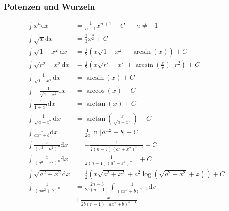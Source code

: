 \documentclass[8pt, a4paper, landscape, fleqn]{scrartcl}
\def\d{\text{d}}
\begin{document}
\begin{multicols*}{3}
				\subsubsection{Potenzen und Wurzeln}
					\vspace{-7pt}
					\begin{align*}
					    \int x^n\text{d}x&= \frac{1}{n+1}x^{n+1}+C \hspace{20pt}n\neq-1\\
					    \int \sqrt{x}\text{d}x&= \frac{2}{3}x^{\frac{3}{2}}+C\\
						\int \sqrt{1-x^2}\text{d}x&= \frac{1}{2} \left(x\sqrt{1-x^2}+\arcsin(x)\right)+C\\
						\int \sqrt{r^2-x^2}\text{d}x&= \frac{1}{2} \left(x\sqrt{r^2-x^2}+\arcsin(\frac{x}{r})\cdot r^2\right)+C\\
						\int \frac{1}{\sqrt{1-x^2}}\text{d}x&=\arcsin(x)+C\\
						\int -\frac{1}{\sqrt{1-x^2}}\text{d}x&=\arccos(x)+C\\
						\int \frac{1}{1+x^2}\text{d}x&=\arctan(x)+C\\
						\int \frac{1}{\sqrt{a-x^2}}\text{d}x&=\arctan{\left(\frac{x}{\sqrt{a-x^2}}\right)}+C\\
						\int
						\frac{x}{ax^2+b}\text{d}x&=\frac{1}{2a}\ln\vert ax^2+b \vert+C\\
						\int
						\frac{x}{(x^2+a^2)^n}\text{d}x&=-\frac{1}{2(n-1)(a^2+x^2)^{n-1}}+C\\
						\int
						\frac{x}{(a^2-x^2)^n}\text{d}x&=\frac{1}{2(n-1)(a^2-x^2)^{n-1}}+C\\
						\int \sqrt{a^2+x^2}\text{d}x&=\frac{1}{2}\left( x\sqrt{a^2+x^2}+a^2 \log ( \sqrt{a^2+x^2}+x ) \right)+C \\
						\int \frac{1}{(ax^2+b)^n} &= \frac{2n-3}{2b(n-1)}\int \frac{1}{(ax^2+b)^{n-1}}\d x \\ &+ \frac{x}{2b(n-1)(ax^2 + b)^{n-1}}
					\end{align*}

\end{multicols*}
\end{document}
